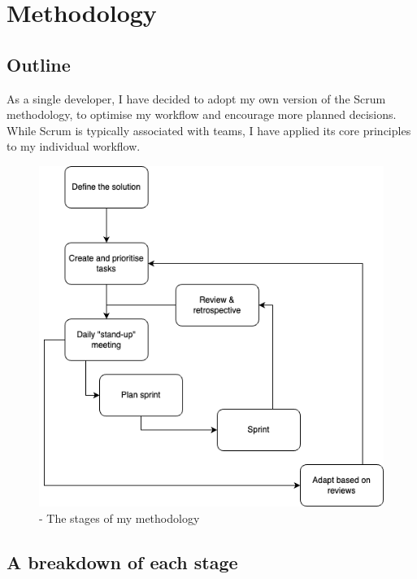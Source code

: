 \newpage

\section{Methodology}

\subsection{Outline}

As a single developer, I have decided to adopt my own version of the Scrum methodology, to optimise my workflow and encourage more planned decisions. While Scrum is typically associated with teams, I have applied its core principles to my individual workflow. \newline

\begin{figure}[h!] 
	\centering    
	\includegraphics[width=1\textwidth]{Methodology diagram (1).png}
	\caption{- The stages of my methodology}
\end{figure}

\newpage

\subsection{A breakdown of each stage}

